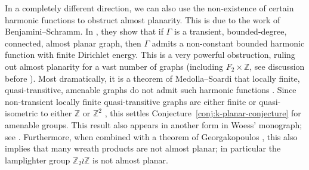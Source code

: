 \documentclass[11pt,a4paper]{amsart}
\newcommand{\Z}{\mathbb{Z}}
\theoremstyle{definition}
\begin{document}
In a completely different direction, we can also use the non-existence of certain harmonic functions to obstruct almost planarity. This is due to the work of Benjamini--Schramm. In \cite{benjamini1996harmonic}, they show that if $\Gamma$ is a transient, bounded-degree, connected, almost planar graph, then $\Gamma$ admits a non-constant bounded harmonic function with finite Dirichlet energy. This is a very powerful obstruction, ruling out almost planarity for a vast number of graphs (including $F_2 \times \Z$, see discussion before \cite[Lem.~7.2]{benjamini1996harmonic}). Most dramatically, it is a theorem of Medolla--Soardi that locally finite, quasi-transitive, amenable graphs do not admit such harmonic functions \cite[Thm.~5.2]{medolla1995extension}. Since non-transient locally finite quasi-transitive graphs are either finite or quasi-isometric to either $\Z$ or $\Z^2$ \cite[Thm.~5.13]{woess2000random}, this settles Conjecture~\ref{conj:k-planar-conjecture} for  amenable groups. 
This result also appears in another form in Woess' monograph; see \cite[p.~138]{woess2000random}. Furthermore, when combined with a theorem of Georgakopoulos \cite{georgakopoulos2010lamplighter}, this also implies that many wreath products are not almost planar; in particular the lamplighter group $\Z_2 \wr \Z$ is not almost planar. 
\end{document}

